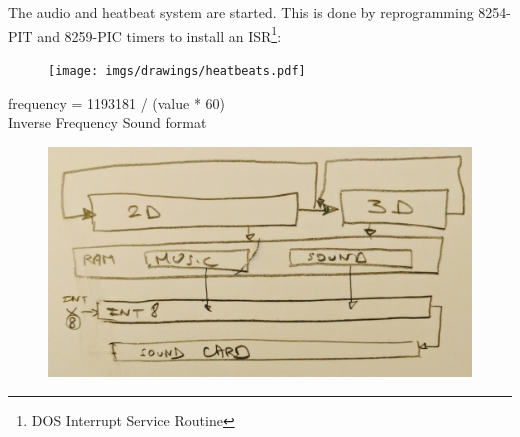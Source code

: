 The audio and heatbeat system are started. This is done by reprogramming 8254-PIT and 8259-PIC timers to install an ISR\footnote{DOS Interrupt Service Routine}:\\
\begin{figure}[H]
\centering
 \texttt{[image: imgs/drawings/heatbeats.pdf]}
 \end{figure}
\par
frequency = 1193181 / (value * 60)\\
Inverse Frequency Sound format\\
\par
\begin{figure}[H]
\centering
 \includegraphics[width=\textwidth]{imgs/drawings/three_blocks.png}
 \end{figure}


